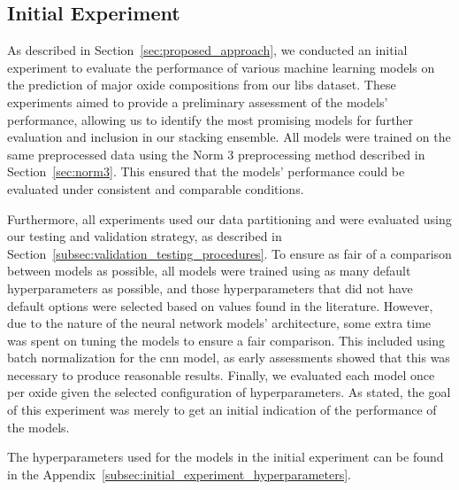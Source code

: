 \subsection{Initial Experiment}\label{sec:initial-experiment}
As described in Section~\ref{sec:proposed_approach}, we conducted an initial experiment to evaluate the performance of various machine learning models on the prediction of major oxide compositions from our \gls{libs} dataset.
These experiments aimed to provide a preliminary assessment of the models' performance, allowing us to identify the most promising models for further evaluation and inclusion in our stacking ensemble.
All models were trained on the same preprocessed data using the Norm 3 preprocessing method described in Section~\ref{sec:norm3}.
This ensured that the models' performance could be evaluated under consistent and comparable conditions.

Furthermore, all experiments used our data partitioning and were evaluated using our testing and validation strategy, as described in Section~\ref{subsec:validation_testing_procedures}.
To ensure as fair of a comparison between models as possible, all models were trained using as many default hyperparameters as possible, and those hyperparameters that did not have default options were selected based on values found in the literature.
However, due to the nature of the neural network models' architecture, some extra time was spent on tuning the models to ensure a fair comparison.
This included using batch normalization for the \gls{cnn} model, as early assessments showed that this was necessary to produce reasonable results.
Finally, we evaluated each model once per oxide given the selected configuration of hyperparameters.
As stated, the goal of this experiment was merely to get an initial indication of the performance of the models.

The hyperparameters used for the models in the initial experiment can be found in the Appendix~\ref{subsec:initial_experiment_hyperparameters}.
